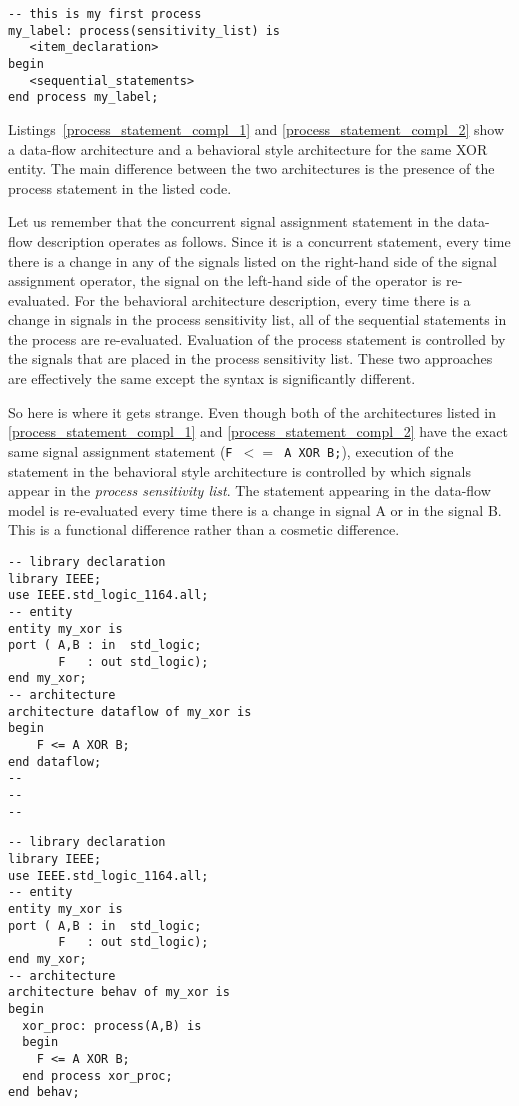 \begin{lstlisting}[float, label=process_statement, caption=Syntax for the process statement.]
-- this is my first process
my_label: process(sensitivity_list) is
   <item_declaration>
begin
   <sequential_statements>
end process my_label;
\end{lstlisting}

Listings~\ref{process_statement_compl_1} and \ref{process_statement_compl_2} show a data-flow architecture and a behavioral style architecture for the same XOR entity. The main difference between the two architectures is the presence of the process statement in the listed code.

Let us remember that the concurrent signal assignment statement in the data-flow description operates as follows. Since it is a concurrent statement, every time there is a change in any of the signals listed on the right-hand side of the signal assignment operator, the signal on the left-hand side of the operator is re-evaluated. For the behavioral architecture description, every time there is a change in signals in the process sensitivity list, all of the sequential statements in the process are re-evaluated. Evaluation of the process statement is controlled by the signals that are placed in the process sensitivity list. These two approaches are effectively the same except the syntax is significantly different.

So here is where it gets strange. Even though both of the architectures listed in \ref{process_statement_compl_1} and \ref{process_statement_compl_2} have the exact same signal assignment statement (\texttt{F $<=$ A XOR B;}), execution of the statement in the behavioral style architecture is controlled by which signals appear in the \textit{process sensitivity list}. The statement appearing in the data-flow model is re-evaluated every time there is a change in signal A or in the signal B. This is a functional difference rather than a cosmetic difference.

\noindent
\begin{minipage}{0.49\linewidth}
\begin{lstlisting}[label=process_statement_compl_1, caption=Data-flow architecture.]
-- library declaration
library IEEE;
use IEEE.std_logic_1164.all;
-- entity
entity my_xor is
port ( A,B : in  std_logic;
       F   : out std_logic);
end my_xor;
-- architecture
architecture dataflow of my_xor is
begin
	F <= A XOR B;
end dataflow;
--
--
--
\end{lstlisting}
\end{minipage}
\begin{minipage}{0.49\linewidth}
\begin{lstlisting}[label=process_statement_compl_2, caption=Behavioral architecture.]
-- library declaration
library IEEE;
use IEEE.std_logic_1164.all;
-- entity
entity my_xor is
port ( A,B : in  std_logic;
       F   : out std_logic);
end my_xor;
-- architecture
architecture behav of my_xor is
begin
  xor_proc: process(A,B) is
  begin
	F <= A XOR B;
  end process xor_proc;
end behav;

\end{lstlisting}
\end{minipage}

